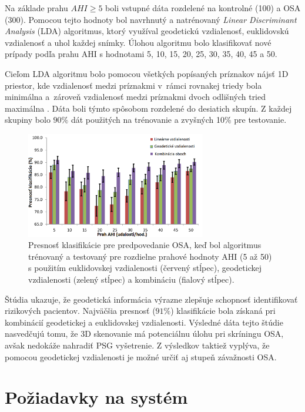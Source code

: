 Na základe prahu $AHI\geq5$ boli vstupné dáta rozdelené na kontrolné (100) a OSA (300). Pomocou tejto hodnoty bol navrhnutý a natrénovaný \textit{Linear Discriminant Analysis} (LDA) algoritmus, ktorý využíval geodetickú vzdialenosť, euklidovskú vzdialenosť a uhol každej snímky. Úlohou algoritmu bolo klasifikovať nové prípady podľa prahu AHI s hodnotami 5, 10, 15, 20, 25, 30, 35, 40, 45 a 50.

Cieľom LDA algoritmu bolo pomocou všetkých popísaných príznakov nájsť 1D priestor, kde vzdialenosť medzi príznakmi v rámci rovnakej triedy bola minimálna a zároveň vzdialenosť medzi príznakmi dvoch odlišných tried maximálna \cite{balakrishnama1998linear}. Dáta boli týmto spôsobom rozdelené do desiatich skupín. Z každej skupiny bolo $ 90\% $ dát použitých na trénovanie a zvyšných 10\% pre testovanie. 

\begin{figure}[h]
	\centering
	\includegraphics[width=0.7\textwidth]{figures/resers_l.png}
	\caption{Presnosť klasifikácie pre predpovedanie OSA, keď bol algoritmus trénovaný a testovaný pre rozdielne prahové hodnoty AHI (5 až 50) s použitím euklidovskej vzdialenosti (červený stĺpec), geodetickej vzdialenosti (zelený stĺpec) a kombináciu (fialový stĺpec). }
	\label{fig:resers:l}
\end{figure}

Štúdia ukazuje, že geodetická informácia výrazne zlepšuje schopnosť identifikovať rizikových pacientov. Najväčšia presnosť ($ 91\% $) klasifikácie bola získaná pri kombinácií geodetickej a euklidovskej vzdialenosti. Výsledné dáta tejto štúdie nasvedčujú tomu, že 3D skenovanie má potenciálnu úlohu pri skríningu OSA, avšak nedokáže nahradiť PSG vyšetrenie. Z výsledkov taktiež vyplýva, že pomocou geodetickej vzdialenosti je možné určiť aj stupeň závažnosti OSA.

\section{Požiadavky na systém}

